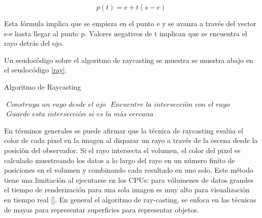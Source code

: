 \begin{equation}
\label{eq:ray_definition}
  p(t) = e+t(s-e)
\end{equation}

Esta fórmula implica que se empieza en el punto e y se avanza a través del vector s-e hasta llegar al punto p. Valores negativos de t implican que se encuentra el rayo detrás del ojo.

Un seudocódigo sobre el algoritmo de raycasting se muestra se muestra abajo en el seudocódigo \ref{ray}.

\begin{algorithm}
\caption{Algoritmo de Raycasting}\label{ray}
\begin{algorithmic}[1]
\State $\textit{ Construya un rayo desde el ojo}$
\State $\textit{ Encuentre la intersección con el rayo}$
\State $\textit{ Guarde esta intersección si es la más cercana}$
\EndFor
\EndFor
\EndProcedure
\end{algorithmic}
\end{algorithm}





En términos generales se puede afirmar que la técnica de raycasting evalúa el color de cada pixel en la imagen al disparar un rayo a través de la escena desde la posición del observador. Si el rayo intersecta el volumen, el color del pixel es calculado muestreando los datos a lo largo del rayo en un número finito de posiciones en el volumen  y combinando cada resultado en uno solo. Este método tiene una limitación al ejecutarse en los CPUs: para vólumenes de datos grandes el tiempo de renderización para una sola imagen es muy alto para visualización en tiempo real [\cite{Marques2009}]. En general el algoritmo de ray-casting, se enfoca en las técnicas de mayas para representar superficies para representar objetos.



